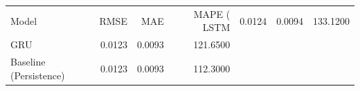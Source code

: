 \begin{tabular}{lrrr}
\toprule
Model & RMSE & MAE & MAPE (%
\midrule
LSTM & 0.0124 & 0.0094 & 133.1200 \\
GRU & 0.0123 & 0.0093 & 121.6500 \\
Baseline (Persistence) & 0.0123 & 0.0093 & 112.3000 \\
\bottomrule
\end{tabular}
